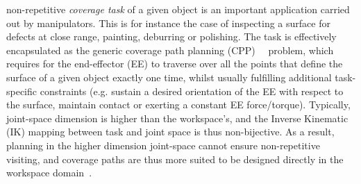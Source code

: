 \documentclass[journal]{IEEEtran}
\begin{document}
 non-repetitive \textit{coverage task} of a given object is an important application carried out by manipulators.
This is for instance the case of inspecting a surface for defects at close range, painting, deburring or polishing. 
The task is effectively encapsulated as the generic coverage path planning (CPP)~\cite{choset2001coverage}~\cite{galceran2013a} problem, which requires for the end-effector (EE) to traverse over all the points that define the surface of a given object exactly one time, whilst usually fulfilling additional task-specific constraints (e.g.  sustain a desired orientation of the EE with respect to the surface, maintain contact or exerting a constant EE force/torque). 
Typically, joint-space dimension is higher than the workspace's, %
and the Inverse Kinematic (IK) mapping between task and joint space is thus non-bijective.  
As a result, planning in the higher dimension joint-space cannot ensure non-repetitive visiting, 
and coverage paths are thus more suited to be designed directly in the workspace domain~\cite{Oriolo2005Motion}.  
\end{document}

